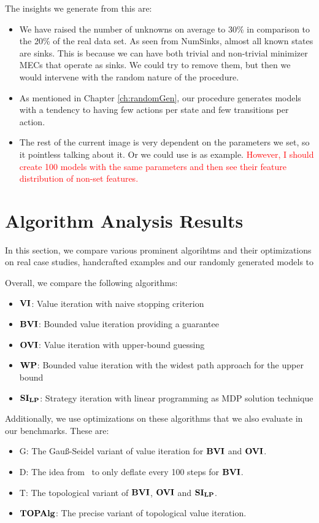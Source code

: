 The insights we generate from this are:
\begin{itemize}
    \item We have raised the number of unknowns on average to 30\% in comparison to the 20\% of the real data set. As seen from NumSinks, almost all known states are sinks.
          This is because we can have both trivial and non-trivial minimizer MECs that operate as sinks.
          We could try to remove them, but then we would intervene with the random nature of the procedure.
    \item As mentioned in Chapter \ref{ch:randomGen}, our procedure generates models with a tendency to having few actions per state and few transitions per action.
    \item The rest of the current image is very dependent on the parameters we set, so it pointless talking about it.
          Or we could use is as example.
          \textcolor{red}{However, I should create 100 models with the same parameters and then see their feature distribution of non-set features.}
\end{itemize}

\section{Algorithm Analysis Results}

In this section, we compare various prominent algorihtms and their optimizations on real case studies, handcrafted examples and our randomly generated models
to 

Overall, we compare the following algorithms:
\begin{itemize}
    \item $\mathbf{VI}$: Value iteration with naive stopping criterion
    \item $\mathbf{BVI}$: Bounded value iteration providing a guarantee \cite{paperMaxi}
    \item $\mathbf{OVI}$: Value iteration with upper-bound guessing \cite{What?}
    \item $\mathbf{WP}$: Bounded value iteration with the widest path approach for the upper bound \cite{widestPath}
    \item $\mathbf{SI_{LP}}$: Strategy iteration with linear programming as MDP solution technique
\end{itemize}

Additionally, we use optimizations on these algorithms that we also evaluate in our benchmarks. These are:
\begin{itemize}
	\item G: The Gau{\ss}-Seidel variant of value iteration for $\mathbf{BVI}$ and $\mathbf{OVI}$.
	\item D: The idea from~\cite{KKKW18} to only deflate every 100 steps for $\mathbf{BVI}$.
	\item T: The topological variant of $\mathbf{BVI}$, $\mathbf{OVI}$ and $\mathbf{SI_{LP}}$.
	\item $\mathbf{TOPAlg}$: The precise variant of topological value iteration.
\end{itemize}

